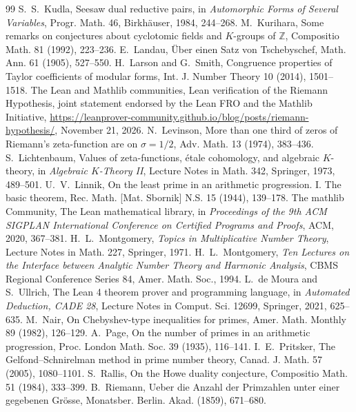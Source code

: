 \documentclass[11pt,letterpaper]{article}
\numberwithin{equation}{section}
\begin{document}
\begin{thebibliography}{99}
 S.~S.~Kudla, Seesaw dual reductive pairs, in \emph{Automorphic Forms of Several Variables}, Progr. Math. 46, Birkh\"auser, 1984, 244--268.
 M.~Kurihara, Some remarks on conjectures about cyclotomic fields and $K$-groups of $\mathbb Z$, Compositio Math. 81 (1992), 223--236.
 E.~Landau, \"Uber einen Satz von Tschebyschef, Math. Ann. 61 (1905), 527--550.
 H.~Larson and G.~Smith, Congruence properties of Taylor coefficients of modular forms, Int. J. Number Theory 10 (2014), 1501--1518.
 The Lean and Mathlib communities, Lean verification of the Riemann Hypothesis, joint statement endorsed by the Lean FRO and the Mathlib Initiative, \url{https://leanprover-community.github.io/blog/posts/riemann-hypothesis/}, November 21, 2026.
 N.~Levinson, More than one third of zeros of Riemann's zeta-function are on $\sigma=1/2$, Adv. Math. 13 (1974), 383--436.
 S.~Lichtenbaum, Values of zeta-functions, \'etale cohomology, and algebraic $K$-theory, in \emph{Algebraic $K$-Theory II}, Lecture Notes in Math. 342, Springer, 1973, 489--501.
 U.~V.~Linnik, On the least prime in an arithmetic progression. I. The basic theorem, Rec. Math. [Mat. Sbornik] N.S. 15 (1944), 139--178.
 The mathlib Community, The Lean mathematical library, in \emph{Proceedings of the 9th ACM SIGPLAN International Conference on Certified Programs and Proofs}, ACM, 2020, 367--381.
 H.~L.~Montgomery, \emph{Topics in Multiplicative Number Theory}, Lecture Notes in Math. 227, Springer, 1971.
 H.~L.~Montgomery, \emph{Ten Lectures on the Interface between Analytic Number Theory and Harmonic Analysis}, CBMS Regional Conference Series 84, Amer. Math. Soc., 1994.
 L.~de Moura and S.~Ullrich, The Lean 4 theorem prover and programming language, in \emph{Automated Deduction, CADE 28}, Lecture Notes in Comput. Sci. 12699, Springer, 2021, 625--635.
 M.~Nair, On Chebyshev-type inequalities for primes, Amer. Math. Monthly 89 (1982), 126--129.
 A.~Page, On the number of primes in an arithmetic progression, Proc. London Math. Soc. 39 (1935), 116--141.
 I.~E.~Pritsker, The Gelfond--Schnirelman method in prime number theory, Canad. J. Math. 57 (2005), 1080--1101.
 S.~Rallis, On the Howe duality conjecture, Compositio Math. 51 (1984), 333--399.
 B.~Riemann, Ueber die Anzahl der Primzahlen unter einer gegebenen Gr\"osse, Monatsber. Berlin. Akad. (1859), 671--680.

\end{thebibliography}
\end{document}
